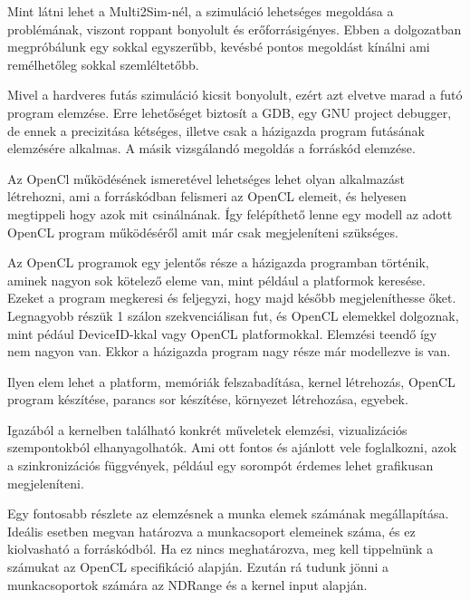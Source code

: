 
Mint látni lehet a Multi2Sim-nél, a szimuláció lehetséges megoldása a problémának, viszont roppant bonyolult és erőforrásigényes. Ebben a dolgozatban megpróbálunk egy sokkal egyszerűbb, kevésbé pontos megoldást kínálni ami remélhetőleg sokkal szemléltetőbb. 

Mivel a hardveres futás szimuláció kicsit bonyolult, ezért azt elvetve marad a futó program elemzése. Erre lehetőséget biztosít a GDB, egy GNU project debugger, de ennek a precizitása kétséges, illetve csak a házigazda program futásának elemzésére alkalmas. A másik vizsgálandó megoldás a forráskód elemzése.

 Az OpenCl működésének ismeretével lehetséges lehet olyan alkalmazást létrehozni, ami a forráskódban felismeri az OpenCL elemeit, és helyesen megtippeli hogy azok mit csinálnának. Így felépíthető lenne egy modell az adott OpenCL program működéséről amit már csak megjeleníteni szükséges.
 
Az OpenCL programok egy jelentős része a házigazda programban történik, aminek nagyon sok kötelező eleme van, mint például a platformok keresése. Ezeket a program megkeresi és feljegyzi, hogy majd később megjeleníthesse őket. Legnagyobb részük 1 szálon szekvenciálisan fut, és OpenCL elemekkel dolgoznak, mint pédául DeviceID-kkal vagy OpenCL platformokkal. Elemzési teendő így nem nagyon van. Ekkor a házigazda program nagy része már modellezve is van.

Ilyen elem lehet a platform, memóriák felszabadítása, kernel létrehozás, OpenCL program készítése, parancs sor készítése, környezet létrehozása, egyebek.



Igazából a kernelben található konkrét műveletek elemzési, vizualizációs szempontokból elhanyagolhatók. Ami ott fontos és ajánlott vele foglalkozni, azok a szinkronizációs függvények, például egy sorompót érdemes lehet grafikusan megjeleníteni.

Egy fontosabb részlete az elemzésnek a munka elemek számának megállapítása. Ideális esetben megvan határozva a munkacsoport elemeinek száma, és ez kiolvasható a forráskódból. Ha ez nincs meghatározva, meg kell tippelnünk a számukat az OpenCL specifikáció alapján. Ezután rá tudunk jönni a munkacsoportok számára az NDRange és a kernel input alapján.


